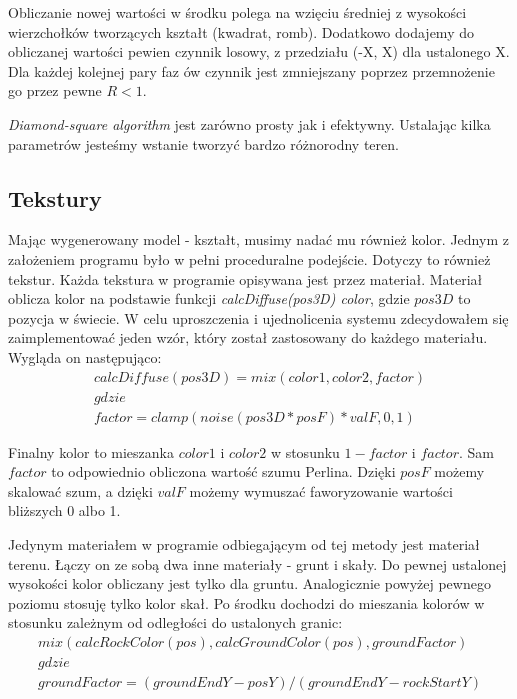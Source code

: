 \documentclass[inz,longabstract]{iithesis}
\begin{document}
            Obliczanie nowej wartości w środku polega na wzięciu średniej z wysokości wierzchołków tworzących kształt (kwadrat, romb). Dodatkowo dodajemy do obliczanej wartości pewien czynnik losowy, z przedziału (-X, X) dla ustalonego X. Dla każdej kolejnej pary faz ów czynnik jest zmniejszany poprzez przemnożenie go przez pewne $R < 1$.
            
            \textit{Diamond-square algorithm} jest zarówno prosty jak i efektywny. Ustalając kilka parametrów jesteśmy wstanie tworzyć bardzo różnorodny teren. 
            
        \subsection{Tekstury}
            Mając wygenerowany model - kształt,  musimy nadać mu również kolor. Jednym z założeniem programu było w pełni proceduralne podejście. Dotyczy to również tekstur. Każda tekstura w programie opisywana jest przez materiał. Materiał oblicza kolor na podstawie funkcji \textit{calcDiffuse(pos3D) \textrightarrow color}, gdzie $pos3D$ to pozycja w świecie. W celu uproszczenia i ujednolicenia systemu zdecydowałem się zaimplementować jeden wzór, który został zastosowany do każdego materiału. Wygląda on następująco:
            \begin{gather*}
                calcDiffuse(pos3D) = mix(color1, color2, factor) \\
                gdzie \\
                factor = clamp(noise(pos3D * posF) * valF, 0, 1)
            \end{gather*}
            

            Finalny kolor to mieszanka $color1$ i $color2$ w stosunku $1 - factor$ i $factor$. Sam $factor$ to odpowiednio obliczona wartość szumu Perlina. Dzięki $posF$ możemy skalować szum, a dzięki $valF$ możemy wymuszać faworyzowanie wartości bliższych 0 albo 1.
            
            Jedynym materiałem w programie odbiegającym od tej metody jest materiał terenu. Łączy on ze sobą dwa inne materiały - grunt i skały. Do pewnej ustalonej wysokości kolor obliczany jest tylko dla gruntu. Analogicznie powyżej pewnego poziomu stosuję tylko kolor skał. Po środku dochodzi do mieszania kolorów w stosunku zależnym od odległości do ustalonych granic:
            \begin{gather*}
            mix(calcRockColor(pos), calcGroundColor(pos), groundFactor) \\
            gdzie \\
            groundFactor = (groundEndY - posY) / (groundEndY - rockStartY) \\
            \end{gather*}
            
\end{document}
